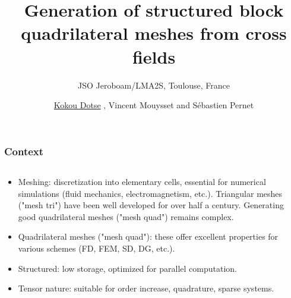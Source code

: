 \documentclass[compress,10pt,aspectratio=169]{beamer}
\title[]{Generation of structured block quadrilateral meshes from cross fields\vspace{0.5cm}}
\subtitle[]{JSO Jeroboam/LMA2S, Toulouse, France\vspace{0.5cm}}
\author[]{\underline{Kokou Dotse}%
, Vincent Mouysset
and Sébastien Pernet
}
\date[]{}
\begin{document}
\MakeTitlePage




\begin{frame}
\frametitle{Context}
\small
\begin{columns}
    \begin{column}{0.8\textwidth}
    \vspace{-0.3cm}
\begin{itemize}
\item {\color{onera} Meshing:} discretization into elementary cells, essential for numerical simulations (fluid mechanics, electromagnetism, etc.). Triangular meshes ("mesh tri") have been well developed for over half a century. Generating good quadrilateral meshes ("mesh quad") remains complex.\\\vspace{0.25cm}

\item {\color{onera} Quadrilateral meshes ("mesh quad"):} these offer excellent properties for various schemes (FD, FEM, SD, DG, etc.).\\\vspace{0.2cm}

\item {\color{onera} Structured:} low storage, optimized for parallel computation.\\\vspace{0.2cm}

\item {\color{onera} Tensor nature:} suitable for order increase, quadrature, sparse systems.\\\vspace{0.2cm}


\end{itemize}
\end{column}
\end{columns}
\end{frame}
\end{document}
